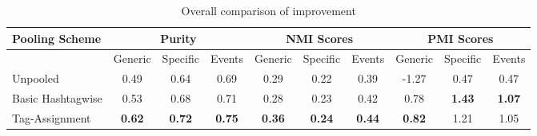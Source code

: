\documentclass[10pt,a5paper,twoside]{article}
\begin{document}
\begin{table}[!h]
\setcounter{table}{13}
\centering
\resizebox{14cm}{!} 
{
	\begin{tabular}{|l|ccc|ccc|ccc|}
	\hline
	Pooling Scheme  & \multicolumn {3}{c}{Purity} & \multicolumn {3}{c}{NMI Scores} & \multicolumn {3}{c|}{PMI Scores}\\
	\hline
	 & Generic & Specific & Events &  Generic & Specific & Events &  Generic & Specific & Events\\
	\hline
	Unpooled & 0.49 & 0.64 & 0.69 & 0.29 & 0.22 & 0.39 & -1.27 & 0.47 & 0.47 \\
	\hline
	Basic Hashtagwise & 0.53 & 0.68 & 0.71 & 0.28 & 0.23 & 0.42 & 0.78 & \textbf{1.43} & \textbf{1.07} \\
	\hline
	Tag-Assignment & \textbf{0.62} & \textbf{0.72} & \textbf{0.75} & \textbf{0.36} & \textbf{0.24} & \textbf{0.44} & \textbf{0.82} & 1.21 & 1.05 \\
	\hline
	\end{tabular}
}
\caption{Overall comparison of improvement}\label{Table}
\end{table}
\end{document}
